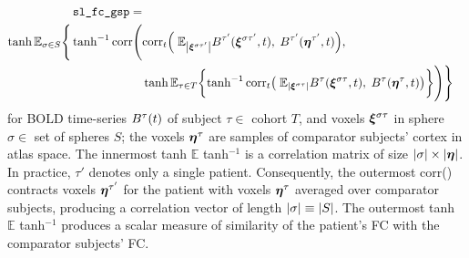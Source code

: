 \documentclass[10pt]{article}
\begin{document}
\begin{equation*}
\begin{split}
  \texttt{sl\_fc\_gsp} = \\
  \hyptangent
  \mathbb{E}_{\sigma \in S} \Bigg\{ 
  \hyptangent^{-1}
  \text{corr} \Bigg( &
            \text{corr}_t\qty( \;
                       \mathbb{E}_{\qty|\vb*{\xi}^{\sigma\tau'}|} B^{\tau'}(\vb*{\xi}^{\sigma\tau'}, t), \; 
                       B^{\tau'}(\vb*{\eta}^{\tau'}, t) ), \; \\
          & \hyptangent
            \mathbb{E}_{\tau \in T} \qty\bigg{ 
            \hyptangent^{-1}
            \text{corr}_t\qty\big( \; 
                       \mathbb{E}_{\qty|\vb*{\xi}^{\sigma\tau}|}B^\tau(\vb*{\xi}^{\sigma\tau}, t), \;
                       B^\tau(\vb*{\eta}^\tau, t) ) }
            \Bigg) \Bigg\} 
\end{split}            
\end{equation*}
for BOLD time-series $B^\tau\qty(t)$ of subject $\tau \in$ cohort $T$, 
and voxels $\vb*{\xi}^{\sigma\tau}$ in sphere $\sigma \in$ set of spheres $S$; 
the voxels $\vb*{\eta}^\tau$ are samples of comparator subjects' cortex in atlas space.  
The innermost tanh $\mathbb{E}$ tanh$^{-1}$ is a correlation matrix of size $\qty|\sigma| \times \qty|\vb*{\eta}|$.  
In practice, $\tau'$ denotes only a single patient.  
Consequently, the outermost corr() contracts voxels $\vb*{\eta}^{\tau'}$ for the patient with voxels $\vb*{\eta}^{\tau}$ averaged over comparator subjects, 
producing a correlation vector of length $\qty|\sigma| \equiv \qty|S|$. 
The outermost tanh $\mathbb{E}$ tanh$^{-1}$ produces a scalar measure of similarity of the patient's FC with the comparator subjects' FC.
\end{document}

